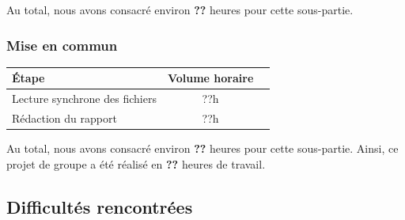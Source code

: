 Au total, nous avons consacré environ \textbf{??} heures pour cette sous-partie. 
  
\subsubsection{Mise en commun}

\begin{flushleft}
\begin{tabular}{|l|c|r|}
  \hline
   Étape & Volume horaire \\
  \hline
 Lecture synchrone des fichiers & ??h \\
    \hline
 Rédaction du rapport & ??h \\
 \hline
    
 \end{tabular}
 \end{flushleft}

Au total, nous avons consacré environ \textbf{??} heures pour cette sous-partie.
\bigbreak
Ainsi, ce projet de groupe a été réalisé en \textbf{??} heures de travail. 
  
  
\bigbreak
\bigbreak
\subsection{Difficultés rencontrées}
\bigbreak

